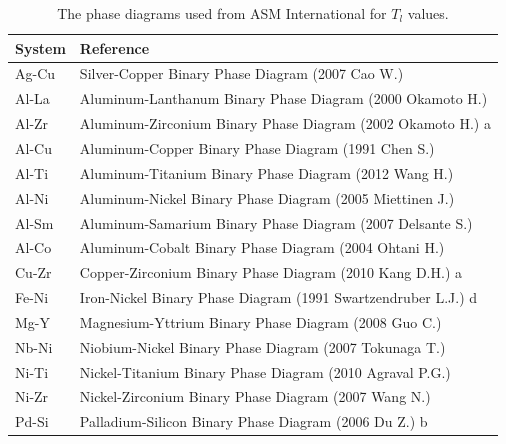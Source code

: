 \documentclass[11pt,a4paper]{article}                                %
\begin{document}
\setcounter{table}{0}
\renewcommand{\thetable}{B\arabic{table}}

\setcounter{figure}{0}
\renewcommand{\thefigure}{B\arabic{figure}}

\begin{table}[H]
\centering
\caption{The phase diagrams used from ASM International for $T_{l}$ values.}
\begin{tabular}{|l|l|}
\hline
{System} & {Reference}                                              \\ \hline
\hline
Ag-Cu            & Silver-Copper   Binary Phase Diagram (2007 Cao W.)              \\ \hline
Al-La            & Aluminum-Lanthanum Binary Phase Diagram   (2000 Okamoto H.)     \\ \hline
Al-Zr            & Aluminum-Zirconium Binary Phase Diagram   (2002 Okamoto H.) a   \\ \hline
Al-Cu            & Aluminum-Copper Binary Phase Diagram   (1991 Chen S.)           \\ \hline
Al-Ti            & Aluminum-Titanium Binary Phase Diagram   (2012 Wang H.)         \\ \hline
Al-Ni            & Aluminum-Nickel Binary Phase Diagram   (2005 Miettinen J.)      \\ \hline
Al-Sm            & Aluminum-Samarium Binary Phase Diagram   (2007 Delsante S.)     \\ \hline
Al-Co            & Aluminum-Cobalt Binary Phase Diagram   (2004 Ohtani H.)         \\ \hline
Cu-Zr            & Copper-Zirconium Binary Phase Diagram   (2010 Kang D.H.) a      \\ \hline
Fe-Ni            & Iron-Nickel Binary Phase Diagram (1991   Swartzendruber L.J.) d \\ \hline
Mg-Y             & Magnesium-Yttrium Binary Phase Diagram   (2008 Guo C.)          \\ \hline
Nb-Ni            & Niobium-Nickel Binary Phase Diagram (2007   Tokunaga T.)        \\ \hline
Ni-Ti            & Nickel-Titanium Binary Phase Diagram   (2010 Agraval P.G.)      \\ \hline
Ni-Zr            & Nickel-Zirconium Binary Phase Diagram   (2007 Wang N.)          \\ \hline
Pd-Si            & Palladium-Silicon Binary Phase Diagram   (2006 Du Z.) b         \\ \hline
\end{tabular}
\label{asm}
\end{table}

\printbibliography[heading=bibintoc]
\end{document}
